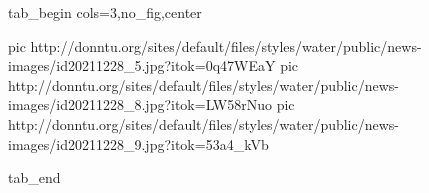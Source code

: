  
 
 
 
 


\ifcmt
  tab_begin cols=3,no_fig,center

     pic http://donntu.org/sites/default/files/styles/water/public/news-images/id20211228_5.jpg?itok=0q47WEaY
		 pic http://donntu.org/sites/default/files/styles/water/public/news-images/id20211228_8.jpg?itok=LW58rNuo
		 pic http://donntu.org/sites/default/files/styles/water/public/news-images/id20211228_9.jpg?itok=53a4_kVb

  tab_end
\fi
